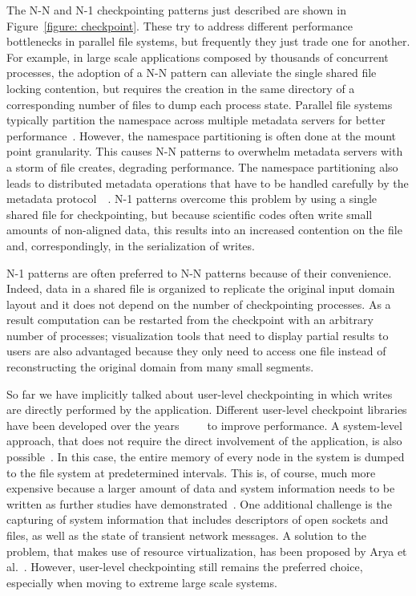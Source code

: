 The N-N and N-1 checkpointing patterns just described are shown in Figure~\ref{figure: checkpoint}. These try to address different performance bottlenecks in parallel file systems, but frequently they just trade one for another. 
For example, in large scale applications composed by thousands of concurrent processes, the adoption of a N-N pattern can alleviate the single shared file locking contention, but requires the creation in the same directory of a 
corresponding number of files to dump each process state. Parallel file systems typically partition the namespace across multiple metadata servers for better performance~\cite{Patil2011}. However, the namespace partitioning is 
often done at the mount point granularity. This causes N-N patterns to overwhelm metadata servers with a storm of file creates, degrading performance. The namespace partitioning also leads to distributed metadata operations that 
have to be handled carefully by the metadata protocol~\cite{Sinnamohideen2010}~\cite{Congiu2012}.
N-1 patterns overcome this problem by using a single shared file for checkpointing, but because scientific codes often write small amounts of non-aligned data, this results into an increased contention on the file and, 
correspondingly, in the serialization of writes. 

N-1 patterns are often preferred to N-N patterns because of their convenience. Indeed, data in a shared file is organized to replicate the original input domain layout and it does not depend on the number of checkpointing processes. 
As a result computation can be restarted from the checkpoint with an arbitrary number of processes; visualization tools that need to display partial results to users are also advantaged because they only need to access one file instead 
of reconstructing the original domain from many small segments.

So far we have implicitly talked about user-level checkpointing in which writes are directly performed by the application. Different user-level checkpoint libraries have been developed over the years~\cite{Bent2009}
~\cite{Frings2009} \cite{Moody2010_2}~\cite{Ansel2009} to improve performance. A system-level approach, that does not require the direct involvement of the application, is also possible~\cite{Wang2007}. In this case, the entire memory 
of every node in the system is dumped to the file system at predetermined intervals. This is, of course, much more expensive because a larger amount of data and system information needs to be written as further studies have
demonstrated~\cite{Kaiser2016}. One additional challenge is the capturing of system information that includes descriptors of open sockets and files, as well as the state of transient network messages. A solution to the problem, that 
makes use of resource virtualization, has been proposed by Arya et al.~\cite{Arya2016}. However, user-level checkpointing still remains the preferred choice, especially when moving to extreme large scale systems.

